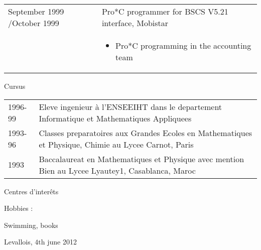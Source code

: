 \documentclass[a4paper,11pt]{letter}
\begin{document}
\begin{tabular}{p{}p{}}
	

September 1999 \slash October 1999 & Pro*C programmer for BSCS V5.21 interface, Mobistar \\
	
& \begin{itemize}
\item Pro*C programming in the accounting team
\end{itemize} \\

\end{tabular}

Cursus

\begin{tabular}{p{}p{}}
1996-99     & Eleve ingenieur à l'ENSEEIHT dans le departement Informatique et Mathematiques Appliquees \\
1993-96     &  Classes preparatoires aux Grandes Ecoles en Mathematiques et Physique, Chimie au Lycee Carnot, Paris \\
1993     &  Baccalaureat en Mathematiques et Physique avec mention Bien au Lycee Lyautey1, Casablanca, Maroc \\
\end{tabular}

Centres d'interêts

Hobbies :

Swimming, books

Levallois, $4\mathrm{th}$ june 2012
\end{document}
